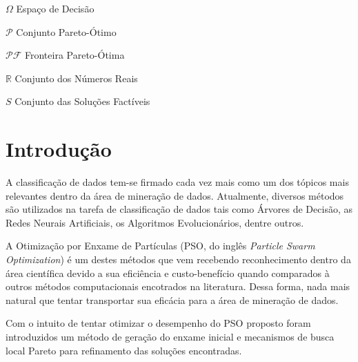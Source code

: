 \documentclass[
	12pt,				%
	openany,			%
	oneside,	
	a4paper,			%
	brazil,				%
	]{unimontes-ppgmsc-abntex2}
\let\oldtextual\textual %
\renewcommand{\textual}{%
  \oldtextual%
  \pagenumbering{arabic} %
  \setcounter{page}{13}
}
\begin{document}
\begin{simbolos}
\item[$ \Omega $] Espaço de Decisão
\item[$ \mathcal{P} $] Conjunto Pareto-Ótimo
\item[$ \mathcal{PF} $] Fronteira Pareto-Ótima
\item[$ \mathbb{R} $] Conjunto dos Números Reais
\item[$ S $] Conjunto das Soluções Factíveis
\end{simbolos}

\listoffigures*
\clearpage

\listoftables*
\clearpage

\textual
\setlength{\headsep}{0.2in}

\chapter[Introdução]{Introdução}
\label{ch: introducao}

A classificação de dados tem-se firmado cada vez mais como um dos tópicos mais relevantes dentro da área de mineração de dados. Atualmente, diversos métodos são utilizados na tarefa de classificação de dados tais como Árvores de Decisão, as Redes Neurais Artificiais, os Algoritmos Evolucionários, dentre outros. 

A Otimização por Enxame de Partículas (PSO, do inglês {\em Particle Swarm Optimization}) é um destes métodos que vem recebendo reconhecimento dentro da área científica devido a sua eficiência e custo-benefício quando comparados à outros métodos computacionais encotrados na literatura. Dessa forma, nada mais natural que tentar transportar sua eficácia para a área de mineração de dados. 

Com o intuito de tentar otimizar o desempenho do PSO proposto foram introduzidos um método de geração do enxame inicial e mecanismos de busca local Pareto para refinamento das soluções encontradas.
\end{document}
